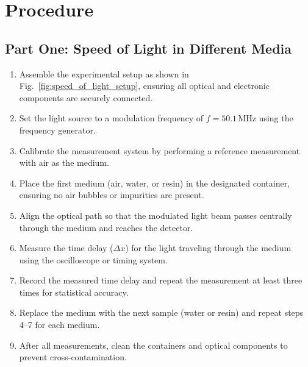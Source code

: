 \documentclass[journal]{IEEEtran}
\begin{document}
\section{Procedure}

\subsection{Part One: Speed of Light in Different Media}
\begin{enumerate}
    \item Assemble the experimental setup as shown in Fig.~\ref{fig:speed_of_light_setup}, ensuring all optical and electronic components are securely connected.
    \item Set the light source to a modulation frequency of $f = 50.1\,\text{MHz}$ using the frequency generator.
    \item Calibrate the measurement system by performing a reference measurement with air as the medium.
    \item Place the first medium (air, water, or resin) in the designated container, ensuring no air bubbles or impurities are present.
    \item Align the optical path so that the modulated light beam passes centrally through the medium and reaches the detector.
    \item Measure the time delay ($\Delta x$) for the light traveling through the medium using the oscilloscope or timing system.
    \item Record the measured time delay and repeat the measurement at least three times for statistical accuracy.
    \item Replace the medium with the next sample (water or resin) and repeat steps 4--7 for each medium.
    \item After all measurements, clean the containers and optical components to prevent cross-contamination.
\end{enumerate}
\end{document}
